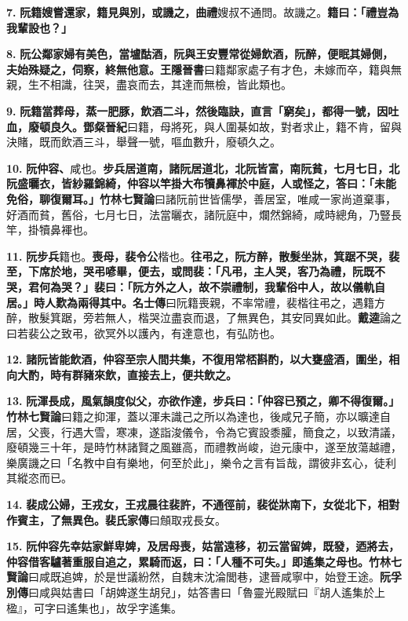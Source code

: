 \textbf{7.} \textbf{阮籍嫂嘗還家，籍見與別，或譏之，}{\footnotesize \textbf{曲禮}嫂叔不通問。故譏之。}\textbf{籍曰：「禮豈為我輩設也？」}

\textbf{8.} \textbf{阮公鄰家婦有美色，當壚酤酒，阮與王安豐常從婦飲酒，阮醉，便眠其婦側，夫始殊疑之，伺察，終無他意。}{\footnotesize \textbf{王隱晉書}曰籍鄰家處子有才色，未嫁而卒，籍與無親，生不相識，往哭，盡哀而去，其達而無檢，皆此類也。}

\textbf{9.} \textbf{阮籍當葬母，蒸一肥豚，飲酒二斗，然後臨訣，直言「窮矣」，都得一號，因吐血，廢頓良久。}{\footnotesize \textbf{鄧粲晉紀}曰籍，母將死，與人圍棊如故，對者求止，籍不肯，留與決賭，既而飲酒三斗，舉聲一號，嘔血數升，廢頓久之。}

\textbf{10.} \textbf{阮仲容、}{\footnotesize 咸也。}\textbf{步兵居道南，諸阮居道北，北阮皆富，南阮貧，七月七日，北阮盛曬衣，皆紗羅錦綺，仲容以竿掛大布犢鼻褌於中庭，人或怪之，答曰：「未能免俗，聊復爾耳。」}{\footnotesize \textbf{竹林七賢論}曰諸阮前世皆儒學，善居室，唯咸一家尚道棄事，好酒而貧，舊俗，七月七日，法當曬衣，諸阮庭中，爛然錦綺，咸時總角，乃豎長竿，掛犢鼻褌也。}

\textbf{11.} \textbf{阮步兵}{\footnotesize 籍也。}\textbf{喪母，裴令公}{\footnotesize 楷也。}\textbf{往弔之，阮方醉，散髮坐牀，箕踞不哭，裴至，下席於地，哭弔喭畢，便去，或問裴：「凡弔，主人哭，客乃為禮，阮既不哭，君何為哭？」裴曰：「阮方外之人，故不崇禮制，我輩俗中人，故以儀軌自居。」時人歎為兩得其中。}{\footnotesize \textbf{名士傳}曰阮籍喪親，不率常禮，裴楷往弔之，遇籍方醉，散髮箕踞，旁若無人，楷哭泣盡哀而退，了無異色，其安同異如此。\textbf{戴逵}論之曰若裴公之致弔，欲冥外以護內，有達意也，有弘防也。}

\textbf{12.} \textbf{諸阮皆能飲酒，仲容至宗人間共集，不復用常桮斟酌，以大甕盛酒，圍坐，相向大酌，時有群豬來飲，直接去上，便共飲之。}

\textbf{13.} \textbf{阮渾長成，風氣韻度似父，亦欲作達，步兵曰：「仲容已預之，卿不得復爾。」}{\footnotesize \textbf{竹林七賢論}曰籍之抑渾，蓋以渾未識己之所以為達也，後咸兄子簡，亦以曠達自居，父喪，行遇大雪，寒凍，遂詣浚儀令，令為它賓設黍臛，簡食之，以致清議，廢頓幾三十年，是時竹林諸賢之風雖高，而禮教尚峻，迨元康中，遂至放蕩越禮，樂廣譏之曰「名教中自有樂地，何至於此」，樂令之言有旨哉，謂彼非玄心，徒利其縱恣而已。}

\textbf{14.} \textbf{裴成公婦，王戎女，王戎晨往裴許，不通徑前，裴從牀南下，女從北下，相對作賓主，了無異色。}{\footnotesize \textbf{裴氏家傳}曰頠取戎長女。}

\textbf{15.} \textbf{阮仲容先幸姑家鮮卑婢，及居母喪，姑當遠移，初云當留婢，既發，迺將去，仲容借客驢著重服自追之，累騎而返，曰：「人種不可失。」即遙集之母也。}{\footnotesize \textbf{竹林七賢論}曰咸既追婢，於是世議紛然，自魏末沈淪閭巷，逮晉咸寧中，始登王途。\textbf{阮孚別傳}曰咸與姑書曰「胡婢遂生胡兒」，姑答書曰「魯靈光殿賦曰『胡人遙集於上楹』，可字曰遙集也」，故孚字遙集。}

